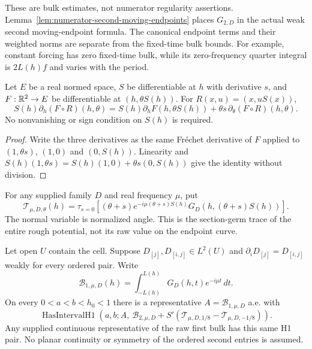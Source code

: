 \begin{remark}
These are bulk estimates, not numerator regularity assertions.
Lemma~\ref{lem:numerator-second-moving-endpoints} places $G_{2,D}$ in the
actual weak second moving-endpoint formula. The canonical endpoint terms
and their weighted norms are separate from the fixed-time bulk bounds.
For example, constant forcing has zero fixed-time bulk, while its
zero-frequency quarter integral is $2L(h)f$ and varies with the period.
\end{remark}

\begin{lemma}
\label{lem:time-rescaling-level}
\leanok
Let $E$ be a real normed space, $S$ be differentiable at $h$ with derivative
$s$, and $F:\mathbb{R}^2\to E$ be differentiable at $(h,\theta S(h))$.
For $R(x,u)=(x,uS(x))$,
\[
 S(h)\partial_h(F\circ R)(h,\theta)
 =S(h)\partial_hF(h,\theta S(h))
   +\theta s\,\partial_\theta(F\circ R)(h,\theta).
\]
No nonvanishing or sign condition on $S(h)$ is required.
\end{lemma}

\begin{proof}
\leanok
Write the three derivatives as the same Fr\'echet derivative of $F$
applied to $(1,\theta s)$, $(1,0)$ and $(0,S(h))$.
Linearity and
$S(h)(1,\theta s)=S(h)(1,0)+\theta s(0,S(h))$
give the identity without division.
\end{proof}

\begin{definition}
\label{def:first-bulk-endpoint-trace}
\leanok
For any supplied family $D$ and real frequency $\mu$, put
\[
 \mathcal T_{\mu,D,\theta}(h)=
 \tau_{s=0}\left[(\theta+s)e^{-i\mu(\theta+s)S(h)}
       G_D(h,(\theta+s)S(h))\right].
\]
The normal variable is normalized angle. This is the section-germ trace
of the entire rough potential, not its raw value on the endpoint curve.
\end{definition}

\begin{lemma}
\label{lem:first-bulk-moving-endpoints}
\leanok
Let open $U$ contain the cell. Suppose
$D_{[j]},D_{[i,j]}\in L^2(U)$ and
$\partial_iD_{[j]}=D_{[i,j]}$ weakly for every ordered pair.
Write
\[
 \mathcal B_{1,\mu,D}(h)=\int_{-L(h)}^{L(h)}
     G_D(h,t)e^{-i\mu t}\,dt .
\]
On every $0<a<b<h_0<1$ there is a representative
$A=\mathcal B_{1,\mu,D}$ a.e. with
\[
 \operatorname{HasIntervalH1}\left(a,b;A,\
 \mathcal B_{2,\mu,D}+S'
   (\mathcal T_{\mu,D,1/8}-\mathcal T_{\mu,D,-1/8})\right).
\]
Any supplied continuous representative of the raw first bulk has this same
H1 pair. No planar continuity or symmetry of the ordered second entries is
assumed.
\end{lemma}

